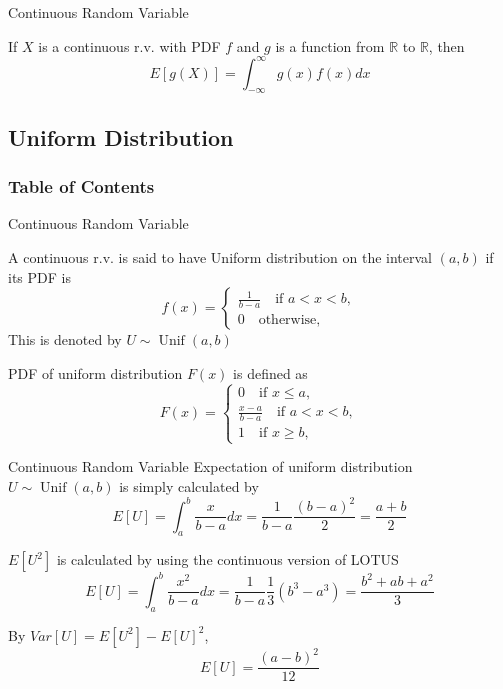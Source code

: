 \documentclass[8pt]{beamer}
\newcommand{\myunif}[2]{\operatorname{Unif}\!\left(#1, #2\right)}
\begin{document}
\begin{frame}{Continuous Random Variable}
    \begin{theorem}
        If $X$ is a continuous r.v. with PDF $f$ and $g$ is a function from $\mathbb{R}$ to $\mathbb{R}$, then
        \[
            E[g(X)] = \int_{-\infty}^\infty g(x)f(x) dx
        \]
    \end{theorem}
\end{frame}

\subsection{Uniform Distribution}

\begin{frame}
    \frametitle{Table of Contents}
    \tableofcontents[currentsection]
\end{frame}


\begin{frame}{Continuous Random Variable}
    \begin{definition}
        A continuous r.v. is said to have Uniform distribution on the interval $(a,b)$ if its PDF is
        \[
        f(x) = \begin{cases}
            \frac{1}{b-a}\quad \text{if } a<x<b, \\ 0 \quad \text{otherwise},
        \end{cases}
        \]
        This is denoted by $U \sim \myunif{a}{b} $
    \end{definition}

    PDF of uniform distribution $F(x)$ is defined as
    \[
        F(x) = \begin{cases}
            0 \quad \text{if } x\leq a,
            \\ \frac{x-a}{b-a} \quad \text{if } a < x <b,
            \\ 1 \quad \text{if } x \geq b,
        \end{cases}
    \]
\end{frame}

\begin{frame}{Continuous Random Variable}
    Expectation of uniform distribution $U \sim \myunif{a}{b}$ is simply calculated by 
    \[
    E[U] = \int_a^b \frac{x}{b-a} dx = \frac{1}{b-a} \frac{(b-a)^2}{2} = \frac{a+b}{2}
    \]

    $E[U^2]$ is calculated by using the continuous version of LOTUS
    \[
    E[U] = \int_a^b \frac{x^2}{b-a} dx = \frac{1}{b-a} \frac{1}{3}(b^3-a^3) = \frac{b^2 + ab + a^2}{3}
    \]

    By $Var[U] = E[U^2] - E[U]^2$,
    \[
        E[U] = \frac{(a-b)^2}{12}
    \]

\end{frame}
\end{document}

